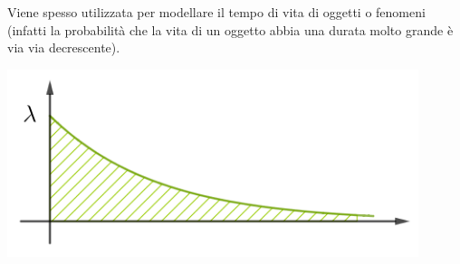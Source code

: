 \begin{minipage}[c]{.45\textwidth}
Viene spesso utilizzata per modellare il tempo di vita di oggetti o fenomeni (infatti la probabilità che la vita di un oggetto abbia una durata molto grande è via via decrescente).
\end{minipage}
\begin{minipage}[c]{.55\textwidth}
\begin{center}
  \includegraphics[width=0.9\textwidth]{img/Esponenziale.png}
\end{center}
\end{minipage}


